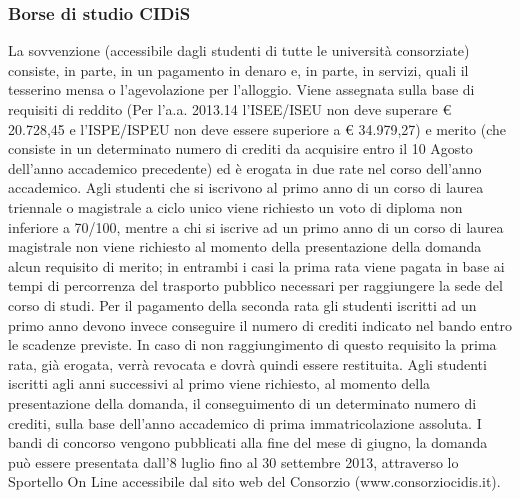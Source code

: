 \subsubsection{Borse di studio CIDiS}
La sovvenzione (accessibile dagli studenti di tutte le università consorziate) consiste, in parte, in un pagamento in denaro e, in parte, in servizi, quali il tesserino mensa o l'agevolazione per l'alloggio. Viene assegnata sulla base di requisiti di reddito (Per l'a.a. 2013.14 l'ISEE/ISEU non deve superare € 20.728,45 e l'ISPE/ISPEU non deve essere superiore a € 34.979,27) e merito (che consiste in un determinato numero di crediti da acquisire entro il 10 Agosto dell'anno accademico precedente) ed è erogata in due rate nel corso dell'anno accademico. Agli studenti che si iscrivono al primo anno di un corso di laurea triennale o magistrale a ciclo unico viene richiesto un voto di diploma non inferiore a 70/100, mentre a chi si iscrive ad un primo anno di un corso di laurea magistrale non viene richiesto al momento della presentazione della domanda alcun requisito di merito; in entrambi i casi la prima rata viene pagata in base ai tempi di percorrenza del trasporto pubblico necessari per raggiungere la sede del corso di studi.
Per il pagamento della seconda rata gli studenti iscritti ad un primo anno devono invece conseguire il numero di crediti indicato nel bando entro le scadenze previste. In caso di non raggiungimento di questo requisito la prima rata, già erogata, verrà revocata e dovrà quindi essere restituita. Agli studenti iscritti agli anni successivi al primo viene richiesto, al momento della presentazione della domanda, il conseguimento di un determinato numero di crediti, sulla base dell'anno accademico di prima immatricolazione assoluta.
I bandi di concorso vengono pubblicati alla fine del mese di giugno, la domanda può essere presentata dall'8 luglio fino al 30 settembre 2013, attraverso lo Sportello On Line accessibile dal sito web del Consorzio (www.consorziocidis.it).

